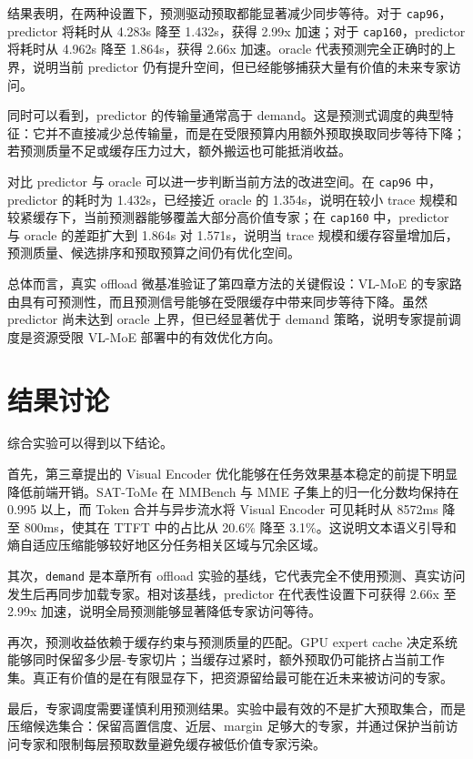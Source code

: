 结果表明，在两种设置下，预测驱动预取都能显著减少同步等待。对于 \texttt{cap96}，predictor 将耗时从 4.283s 降至 1.432s，获得 2.99x 加速；对于 \texttt{cap160}，predictor 将耗时从 4.962s 降至 1.864s，获得 2.66x 加速。oracle 代表预测完全正确时的上界，说明当前 predictor 仍有提升空间，但已经能够捕获大量有价值的未来专家访问。

同时可以看到，predictor 的传输量通常高于 demand。这是预测式调度的典型特征：它并不直接减少总传输量，而是在受限预算内用额外预取换取同步等待下降；若预测质量不足或缓存压力过大，额外搬运也可能抵消收益。

对比 predictor 与 oracle 可以进一步判断当前方法的改进空间。在 \texttt{cap96} 中，predictor 的耗时为 1.432s，已经接近 oracle 的 1.354s，说明在较小 trace 规模和较紧缓存下，当前预测器能够覆盖大部分高价值专家；在 \texttt{cap160} 中，predictor 与 oracle 的差距扩大到 1.864s 对 1.571s，说明当 trace 规模和缓存容量增加后，预测质量、候选排序和预取预算之间仍有优化空间。

总体而言，真实 offload 微基准验证了第四章方法的关键假设：VL-MoE 的专家路由具有可预测性，而且预测信号能够在受限缓存中带来同步等待下降。虽然 predictor 尚未达到 oracle 上界，但已经显著优于 demand 策略，说明专家提前调度是资源受限 VL-MoE 部署中的有效优化方向。

\section{结果讨论}
综合实验可以得到以下结论。

首先，第三章提出的 Visual Encoder 优化能够在任务效果基本稳定的前提下明显降低前端开销。SAT-ToMe 在 MMBench 与 MME 子集上的归一化分数均保持在 0.995 以上，而 Token 合并与异步流水将 Visual Encoder 可见耗时从 8572ms 降至 800ms，使其在 TTFT 中的占比从 20.6\% 降至 3.1\%。这说明文本语义引导和熵自适应压缩能够较好地区分任务相关区域与冗余区域。

其次，\texttt{demand} 是本章所有 offload 实验的基线，它代表完全不使用预测、真实访问发生后再同步加载专家。相对该基线，predictor 在代表性设置下可获得 2.66x 至 2.99x 加速，说明全局预测能够显著降低专家访问等待。

再次，预测收益依赖于缓存约束与预测质量的匹配。GPU expert cache 决定系统能够同时保留多少层-专家切片；当缓存过紧时，额外预取仍可能挤占当前工作集。真正有价值的是在有限显存下，把资源留给最可能在近未来被访问的专家。

最后，专家调度需要谨慎利用预测结果。实验中最有效的不是扩大预取集合，而是压缩候选集合：保留高置信度、近层、margin 足够大的专家，并通过保护当前访问专家和限制每层预取数量避免缓存被低价值专家污染。

